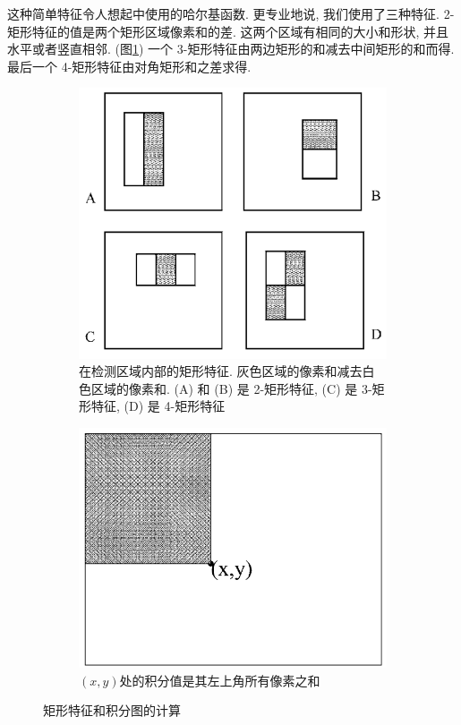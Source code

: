 \documentclass[a4paper,utf8,11pt, onecolumn]{ctexart}
\renewcommand{\captionlabelfont}{\kaishu\zihao{5}}
\begin{document}
这种简单特征令人想起\citet{papageorgiou1998general}中使用的哈尔基函数. 更专业地说, 我们使用了三种特征. 2-矩形特征的值是两个矩形区域像素和的差. 这两个区域有相同的大小和形状, 并且水平或者竖直相邻. (图\ref{fig:rectangle})
一个 3-矩形特征由两边矩形的和减去中间矩形的和而得. 最后一个 4-矩形特征由对角矩形和之差求得. 
\begin{figure}[!htb]
\centering
\begin{subfigure}{0.3\textwidth}
\includegraphics[width=\textwidth]{rectangle.png}
\renewcommand{\captionlabelfont}{\kaishu\zihao{6}}
\caption{ 在检测区域内部的矩形特征. 灰色区域的像素和减去白色区域的像素和. (A) 和 (B) 是 2-矩形特征, (C) 是 3-矩形特征, (D) 是 4-矩形特征}
\label{fig:rectangle}
\end{subfigure}
\quad\quad\quad\quad
\begin{subfigure}{0.3\textwidth}
\includegraphics[width=\textwidth]{int.png}
\renewcommand{\captionlabelfont}{\kaishu\zihao{6}}
\caption{$(x,y)$处的积分值是其左上角所有像素之和}
\label{fig:int}
\end{subfigure}
\caption{矩形特征和积分图的计算}
\end{figure}
\end{document}
